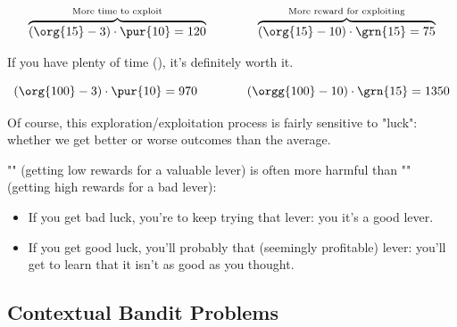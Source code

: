         \begin{equation}
            \overbrace{(\org{15}-3) \cdot \pur{10} = 120 
            }^{\text{More time to exploit}}
            \qquad \qquad 
            \overbrace{
            (\org{15}-10) \cdot \grn{15} = 75
            }^{\text{More reward for exploiting}}
        \end{equation}

        If you have plenty of time (), it's definitely worth it.

        \begin{equation}
            (\org{100}-3) \cdot \pur{10} = 970 \qquad \qquad (\orgg{100}-10) \cdot \grn{15} = 1350
        \end{equation}
        
        

        Of course, this exploration/exploitation process is fairly sensitive to "luck": whether we get better or worse outcomes than the average.
            \\
        

        \begin{concept}
            "" (getting low rewards for a valuable lever) is often more harmful than "" (getting high rewards for a bad lever):

            \begin{itemize}
                \item If you get bad luck, you're  to keep trying that lever: you  it's a good lever.
    
                \item If you get good luck, you'll probably  that (seemingly profitable) lever: you'll get  to learn that it isn't as good as you thought.
            \end{itemize}

            
        \end{concept}




    \phantom{}
    

    \subsection{Contextual Bandit Problems}

